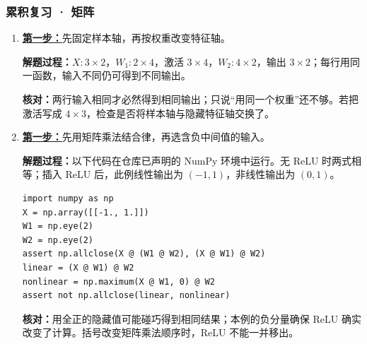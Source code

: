 \subsubsection*{累积复习 · 矩阵}
\begin{enumerate}[label={},leftmargin=4.8em,itemsep=4pt]
\item[\textbf{R-03.}] \leavevmode{}\label{solution:R-03}\label{solution:review-matrix-shapes}\hyperref[exercise:review-matrix-shapes]{\textbf{第一步：}}先固定样本轴，再按权重改变特征轴。\par\nobreak\textbf{解题过程：}$X:3\times2$，$W_1:2\times4$，激活 $3\times4$，$W_2:4\times2$，输出 $3\times2$；每行用同一函数，输入不同仍可得到不同输出。\par\textbf{核对：}两行输入相同才必然得到相同输出；只说“用同一个权重”还不够。若把激活写成 $4\times3$，检查是否将样本轴与隐藏特征轴交换了。
\item[\textbf{R-04.}] \leavevmode{}\label{solution:R-04}\label{solution:review-matrix-nonlinearity}\hyperref[exercise:review-matrix-nonlinearity]{\textbf{第一步：}}先用矩阵乘法结合律，再选含负中间值的输入。\par\nobreak
\textbf{解题过程：}以下代码在仓库已声明的 NumPy 环境中运行。无 ReLU 时两式相等；插入 ReLU 后，此例线性输出为 $(-1,1)$，非线性输出为 $(0,1)$。\par\nobreak
\begin{samepage}\begin{verbatim}
import numpy as np
X = np.array([[-1., 1.]])
W1 = np.eye(2)
W2 = np.eye(2)
assert np.allclose(X @ (W1 @ W2), (X @ W1) @ W2)
linear = (X @ W1) @ W2
nonlinear = np.maximum(X @ W1, 0) @ W2
assert not np.allclose(linear, nonlinear)
\end{verbatim}\end{samepage}
\textbf{核对：}用全正的隐藏值可能碰巧得到相同结果；本例的负分量确保 ReLU 确实改变了计算。括号改变矩阵乘法顺序时，ReLU 不能一并移出。
\end{enumerate}
